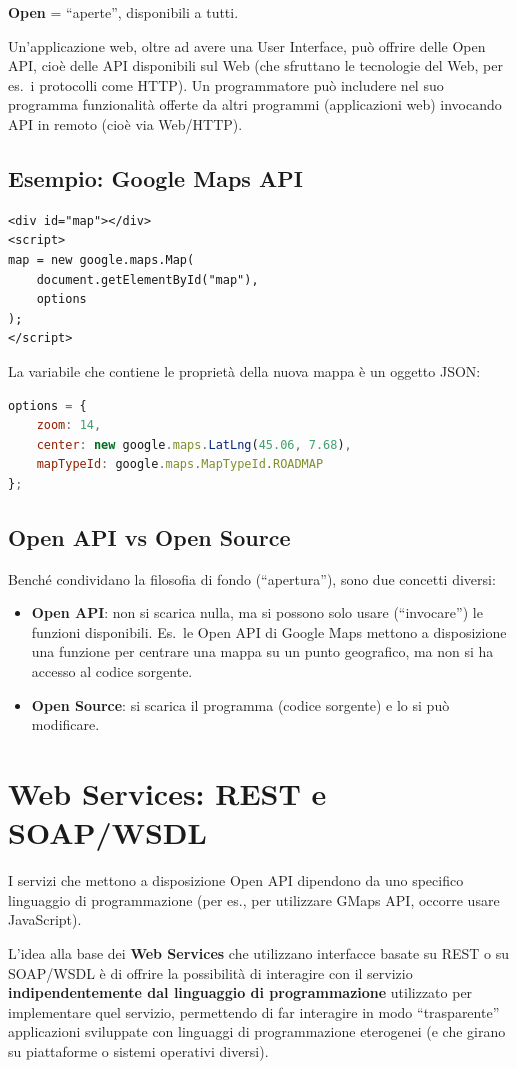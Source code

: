 \textbf{Open} = ``aperte'', disponibili a tutti.

Un'applicazione web, oltre ad avere una User Interface, può offrire delle Open API, cioè delle API disponibili sul Web (che sfruttano le tecnologie del Web, per es.\ i protocolli come HTTP). Un programmatore può includere nel suo programma funzionalità offerte da altri programmi (applicazioni web) invocando API in remoto (cioè via Web/HTTP).

\subsection{Esempio: Google Maps API}

\begin{lstlisting}[language=HTML5]
<div id="map"></div>
<script>
map = new google.maps.Map(
    document.getElementById("map"),
    options
);
</script>
\end{lstlisting}

La variabile che contiene le proprietà della nuova mappa è un oggetto JSON:

\begin{lstlisting}[language=JavaScript]
options = {
    zoom: 14,
    center: new google.maps.LatLng(45.06, 7.68),
    mapTypeId: google.maps.MapTypeId.ROADMAP
};
\end{lstlisting}

\subsection{Open API vs Open Source}

Benché condividano la filosofia di fondo (``apertura''), sono due concetti diversi:

\begin{itemize}
    \item \textbf{Open API}: non si scarica nulla, ma si possono solo usare (``invocare'') le funzioni disponibili. Es.\ le Open API di Google Maps mettono a disposizione una funzione per centrare una mappa su un punto geografico, ma non si ha accesso al codice sorgente.
    \item \textbf{Open Source}: si scarica il programma (codice sorgente) e lo si può modificare.
\end{itemize}

\section{Web Services: REST e SOAP/WSDL}

I servizi che mettono a disposizione Open API dipendono da uno specifico linguaggio di programmazione (per es., per utilizzare GMaps API, occorre usare JavaScript).

L'idea alla base dei \textbf{Web Services} che utilizzano interfacce basate su REST o su SOAP/WSDL è di offrire la possibilità di interagire con il servizio \textbf{indipendentemente dal linguaggio di programmazione} utilizzato per implementare quel servizio, permettendo di far interagire in modo ``trasparente'' applicazioni sviluppate con linguaggi di programmazione eterogenei (e che girano su piattaforme o sistemi operativi diversi).
